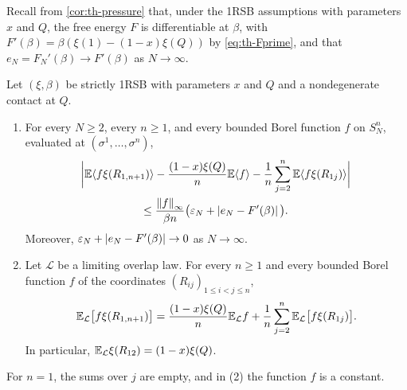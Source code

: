 Recall from \cref{cor:th-pressure} that, under the 1RSB assumptions with parameters $x$ and $Q$, the free energy $F$ is differentiable at $\beta$, with $F'(\beta)=\beta(\xi(1)-(1-x)\xi(Q))$ by \eqref{eq:th-Fprime}, and that $e_N=F_N'(\beta)\to F'(\beta)$ as $N\to\infty$.

\begin{lemma}\label{lem:dir-GG}
Let $(\xi,\beta)$ be strictly 1RSB with parameters $x$ and $Q$ and a nondegenerate contact at $Q$.
\begin{enumerate}
\item For every $N\ge2$, every $n\ge1$, and every bounded Borel function $f$ on $S_N^n$, evaluated at $(\sigma^1,\dots,\sigma^n)$,
\begin{multline}\label{eq:dir-GG-defect}
\bigg|\mathbb E\langle f\xi(R_{1,n+1})\rangle-\frac{(1-x)\xi(Q)}n\mathbb E\langle f\rangle-\frac1n\sum_{j=2}^n\mathbb E\langle f\xi(R_{1j})\rangle\bigg|\\
\le\frac{\left\lVert f\right\rVert_\infty}{\beta n}\big(\varepsilon_N+\left|e_N-F'(\beta)\right|\big).
\end{multline}
Moreover, $\varepsilon_N+\left|e_N-F'(\beta)\right|\to0$ as $N\to\infty$.
\item Let $\mathcal L$ be a limiting overlap law. For every $n\ge1$ and every bounded Borel function $f$ of the coordinates $(R_{ij})_{1\le i<j\le n}$,
\begin{equation}\label{eq:dir-GG}
\mathbb E_{\mathcal L}\big[f\xi(R_{1,n+1})\big]=\frac{(1-x)\xi(Q)}n\mathbb E_{\mathcal L}f+\frac1n\sum_{j=2}^n\mathbb E_{\mathcal L}\big[f\xi(R_{1j})\big].
\end{equation}
In particular, $\mathbb E_{\mathcal L}\xi(R_{12})=(1-x)\xi(Q)$.
\end{enumerate}
For $n=1$, the sums over $j$ are empty, and in (2) the function $f$ is a constant.
\end{lemma}

